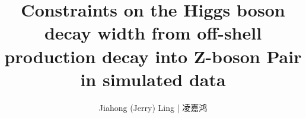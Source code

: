 

\title{Constraints on the Higgs boson decay width from off-shell production decay into
Z-boson Pair in simulated data}

\author{Jiahong (Jerry) Ling | 凌嘉鸿}

   

\othermemberB{\quad} %

